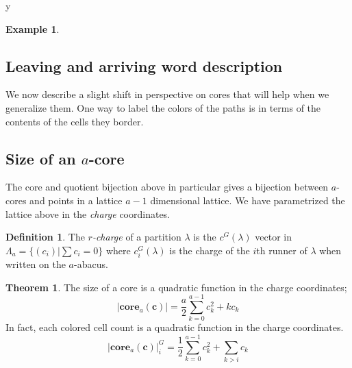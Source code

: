 y\documentclass{amsart}[12pt]
\theoremstyle{definition}
\newtheorem{theorem}[dummy]{Theorem}
\newtheorem{example}[dummy]{Example}
\newtheorem{definition}[dummy]{Definition}
\newcommand{\core}{\mathbf{core}}
\begin{document}
\begin{example}
\begin{center}
\end{center}
\end{example}



\subsection{Leaving and arriving word description}

We now describe a slight shift in perspective on cores that will help when we generalize them.  One way to label the colors of the paths is in terms of the contents of the cells they border.  



\subsection{Size of an \texorpdfstring{$a$}{a}-core}
The core and quotient bijection above in particular gives a bijection between $a$-cores and points in a lattice $a-1$ dimensional lattice.  We have parametrized the lattice above in the \emph{charge} coordinates.  


\begin{definition}
The \emph{$r$-charge} of a partition $\lambda$ is the $c^G(\lambda)$ vector in $\Lambda_a=\{(c_i)|\sum c_i=0\}$ where $c_i^G(\lambda)$ is the charge of the $i$th runner of $\lambda$ when written on the $a$-abacus.
\end{definition}




\begin{theorem} \label{thm:quadratic-sl2}
The size of a core is a quadratic function in the charge coordinates;
$$|\core_a(\mathbf{c})|=\frac{a}{2}\sum_{k=0}^{a-1} c_k^2+ kc_k$$
In fact, each colored cell count is a quadratic function in the charge coordinates.
$$|\core_a(\mathbf{c})|^G_i=\frac{1}{2}\sum_{k=0}^{a-1} c_k^2+ \sum_{k>i}c_k$$
\end{theorem}
\end{document}
